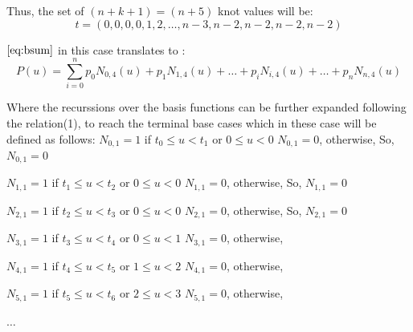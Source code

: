 \documentclass{article}
\begin{document}
Thus, the set of $(n+k+1) = (n+5)$ knot values will be: \newline
\[ t = (0,0,0,0,1,2, \dots, n-3, n-2,n-2,n-2,n-2)\]

$\eqref{eq:bsum}$ in this case translates to : \newline
\begin{equation}
 P(u) = \sum_{i=0}^n p_0 N_{0,4}(u) + p_1 N_{1,4}(u) + \dots + p_i N_{i,4}(u) + \dots + p_n N_{n,4}(u) 
 \label{eq:cubasis}
\end{equation}

Where the recurssions over the basis functions can be further expanded following the relation(1), to reach the terminal base cases which in these case will be defined as follows: \newline
$N_{0,1} = 1 $ if $t_0 \leq u < t_1$ or $0 \leq u < 0$ \newline
$N_{0,1} = 0$, otherwise, \newline
So, $N_{0,1} = 0$ \newline \newline

$N_{1,1} = 1 $ if $t_1 \leq u < t_2$ or $0 \leq u < 0$ \newline
$N_{1,1} = 0$, otherwise, \newline
So, $N_{1,1} = 0$ \newline \newline

$N_{2,1} = 1 $ if $t_2 \leq u < t_3$ or $0 \leq u < 0$ \newline
$N_{2,1} = 0$, otherwise, \newline
So, $N_{2,1} = 0$ \newline \newline

$N_{3,1} = 1$ if $t_3 \leq u < t_4$ or $0 \leq u < 1$ \newline
$N_{3,1} = 0$, otherwise, \newline \newline

$N_{4,1} = 1$ if $t_4 \leq u < t_5$ or $1 \leq u < 2$ \newline
$N_{4,1} = 0$, otherwise, \newline \newline

$N_{5,1} = 1$ if $t_5 \leq u < t_6$ or $2 \leq u < 3$ \newline
$N_{5,1} = 0$, otherwise, \newline 

$\dots$ \newline
\end{document}
